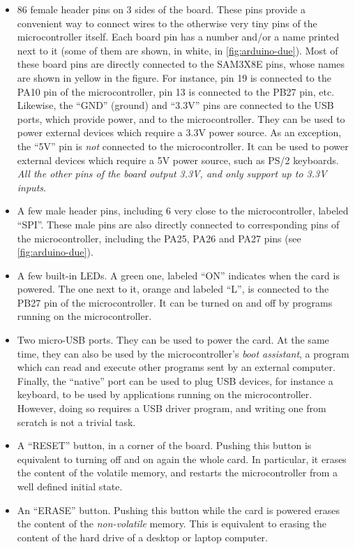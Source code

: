 \begin{itemize}
	\item 86 female header pins on 3 sides of the board. These pins provide a
	convenient way to connect wires to the otherwise very tiny pins of the
	microcontroller itself. Each board pin has a number and/or a name printed
	next to it (some of them are shown, in white, in \cref{fig:arduino-due}).
	Most of these board pins are directly connected to the SAM3X8E pins, whose
	names are shown in yellow in the figure. For instance, pin 19 is connected to
	the PA10 pin of the microcontroller, pin 13 is connected to the PB27 pin,
	etc. Likewise, the ``GND'' (ground) and ``3.3V'' pins are connected to the
	USB ports, which provide power, and to the microcontroller. They can be used
	to power external devices which require a 3.3V power source. As an exception,
	the ``5V'' pin is {\em not} connected to the microcontroller. It can be used
	to power external devices which require a 5V power source, such as PS/2
	keyboards. {\em All the other pins of the board output 3.3V, and only support
	up to 3.3V inputs}.

	\item A few male header pins, including 6 very close to the microcontroller,
	labeled ``SPI''. These male pins are also directly connected to corresponding
	pins of the microcontroller, including the PA25, PA26 and PA27 pins (see
	\cref{fig:arduino-due}).

	\item A few built-in LEDs. A green one, labeled ``ON'' indicates when the
	card is powered. The one next to it, orange and labeled ``L'', is connected
	to the PB27 pin of the microcontroller. It can be turned on and off by
	programs running on the microcontroller.

	\item Two micro-USB ports. They can be used to power the card. At the same
	time, they can also be used by the microcontroller's {\em boot assistant}, a
	program which can read and execute other programs sent by an external
	computer. Finally, the ``native'' port can be used to plug USB devices, for
	instance a keyboard, to be used by applications running on the
	microcontroller. However, doing so requires a USB driver program, and writing
	one from scratch is not a trivial task.

	\item A ``RESET'' button, in a corner of the board. Pushing this button is
	equivalent to turning off and on again the whole card. In particular, it
	erases the content of the volatile memory, and restarts the microcontroller
	from a well defined initial state.

	\item An ``ERASE'' button. Pushing this button while the card is powered
	erases the content of the {\em non-volatile} memory. This is equivalent to
	erasing the content of the hard drive of a desktop or laptop computer.
\end{itemize}

